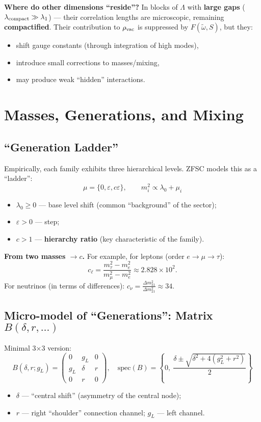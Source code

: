 \documentclass[12pt,a4paper]{article}
\begin{document}
\textbf{Where do other dimensions ``reside''?}  
In blocks of \(\Lambda\) with \textbf{large gaps} (\(\lambda_{\rm compact} \gg \lambda_1\)) — their correlation lengths are microscopic, remaining \textbf{compactified}. Their contribution to \(\rho_{\rm vac}\) is suppressed by \(F(\tilde{\omega},S)\), but they:
\begin{itemize}
    \item shift gauge constants (through integration of high modes),
    \item introduce small corrections to masses/mixing,
    \item may produce weak ``hidden'' interactions.
\end{itemize}

\section{Masses, Generations, and Mixing}

\subsection{``Generation Ladder''}
Empirically, each family exhibits three hierarchical levels. ZFSC models this as a ``ladder'':
\[
\boxed{\mu = \{0, \varepsilon, c \varepsilon \}, \qquad
m_i^2 \propto \lambda_0 + \mu_i} \tag{12}
\]
\begin{itemize}
    \item \(\lambda_0 \ge 0\) — base level shift (common ``background'' of the sector);
    \item \(\varepsilon > 0\) — step;
    \item \(c > 1\) — \textbf{hierarchy ratio} (key characteristic of the family).
\end{itemize}

\textbf{From two masses \(\to c\).}  
For example, for leptons (order \(e \to \mu \to \tau\)):
\[
c_\ell = \frac{m_\tau^2 - m_e^2}{m_\mu^2 - m_e^2} \approx 2.828 \times 10^2. \tag{13}
\]
For neutrinos (in terms of differences): \(c_\nu = \frac{\Delta m_{31}^2}{\Delta m_{21}^2} \approx 34\).

\subsection{Micro-model of ``Generations'': Matrix \(B(\delta,r,\dots)\)}
Minimal 3×3 version:
\[
\boxed{
B(\delta,r;g_L) = \begin{pmatrix}
0 & g_L & 0 \\
g_L & \delta & r \\
0 & r & 0
\end{pmatrix}, \quad
\mathrm{spec}(B) = \left\{ 0, \ \frac{\delta \pm \sqrt{\delta^2 + 4(g_L^2 + r^2)}}{2} \right\}
} \tag{14}
\]
\begin{itemize}
    \item \(\delta\) — ``central shift'' (asymmetry of the central node);
    \item \(r\) — right ``shoulder'' connection channel; \(g_L\) — left channel.
\end{itemize}
\end{document}
